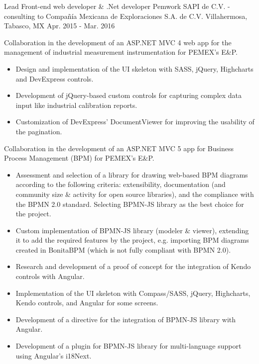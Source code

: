 \begin{cventries}

\cventry
{Lead Front-end web developer \& .Net developer} %
{Pemwork SAPI de C.V. - consulting to Compañía Mexicana de Exploraciones S.A. de C.V.} %
{Villahermosa, Tabasco, MX} %
{Apr. 2015 - Mar. 2016} %
{ %
	\begin{cvitems}
		\item{Collaboration in the development of an ASP.NET MVC 4 web app for the management of industrial measurement instrumentation for PEMEX's E\&P.}
		\begin{itemize}
			\item{Design and implementation of the UI skeleton with SASS, jQuery, Highcharts and DevExpress controls.}
			\item{Development of jQuery-based custom controls for capturing complex data input like industrial calibration reports.}
			\item{Customization of DevExpress' DocumentViewer for improving the usability of the pagination.}
		\end{itemize}		
		\item{Collaboration in the development of an ASP.NET MVC 5 app for Business Process Management (BPM) for PEMEX's E\&P.}
		\begin{itemize}
			\item{Assessment and selection of a library for drawing web-based BPM diagrams according to the following criteria: extensibility, documentation (and community size \& activity for open source libraries), and the compliance with the BPMN 2.0 standard. Selecting BPMN-JS library as the best choice for the project.}
			\item{Custom implementation of BPMN-JS library (modeler \& viewer), extending it to add the required features by the project, e.g. importing BPM diagrams created in BonitaBPM (which is not fully compliant with BPMN 2.0).}
			\item{Research and development of a proof of concept for the integration of Kendo controls with Angular.}
			\item{Implementation of the UI skeleton with Compass/SASS, jQuery, Highcharts, Kendo controls, and Angular for some screens.}
			\item{Development of a directive for the integration of BPMN-JS library with Angular.}
			\item{Development of a plugin for BPMN-JS library for multi-language support using Angular's i18Next.}
		\end{itemize}
	\end{cvitems}
}


\end{cventries}
